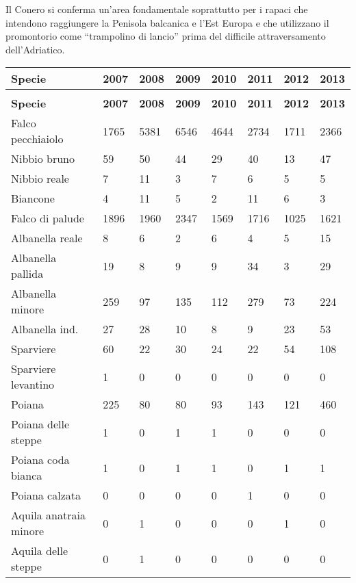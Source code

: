 Il Conero si conferma un{\textquoteright}area fondamentale soprattutto
per i rapaci che intendono raggiungere la Penisola balcanica e
l{\textquoteright}Est Europa e che utilizzano il promontorio come
{\textquotedblleft}trampolino di lancio{\textquotedblright} prima del
difficile attraversamento dell{\textquoteright}Adriatico.
\begin{longtable}{>{\raggedright\arraybackslash}p{}SSSSSSS}
\toprule
\textbf{Specie} & \textbf{2007} & \textbf{2008} & \textbf{2009} & \textbf{2010} & \textbf{2011} & \textbf{2012} & \textbf{2013} \\
\toprule
\endfirsthead
{} \\
\toprule
\textbf{Specie} & \textbf{2007} & \textbf{2008} & \textbf{2009} & \textbf{2010} & \textbf{2011} & \textbf{2012} & \textbf{2013} \\
\toprule
\endhead
 Falco pecchiaiolo & 1765 & 5381 & 6546 & 4644 & 2734 & 1711 & 2366 \\
 Nibbio bruno & 59 & 50 & 44 & 29 & 40 & 13 & 47 \\
 Nibbio reale & 7 & 11 & 3 & 7 & 6 & 5 & 5 \\
 Biancone & 4 & 11 & 5 & 2 & 11 & 6 & 3 \\
 Falco di palude & 1896 & 1960 & 2347 & 1569 & 1716 & 1025 & 1621 \\
 Albanella reale & 8 & 6 & 2 & 6 & 4 & 5 & 15 \\
 Albanella pallida & 19 & 8 & 9 & 9 & 34 & 3 & 29 \\
 Albanella minore & 259 & 97 & 135 & 112 & 279 & 73 & 224 \\
 Albanella ind. & 27 & 28 & 10 & 8 & 9 & 23 & 53 \\
 Sparviere & 60 & 22 & 30 & 24 & 22 & 54 & 108 \\
 Sparviere levantino & 1 & 0 & 0 & 0 & 0 & 0 & 0 \\
 Poiana & 225 & 80 & 80 & 93 & 143 & 121 & 460 \\
 Poiana delle steppe & 1 & 0 & 1 & 1 & 0 & 0 & 0 \\
 Poiana coda bianca & 1 & 0 & 1 & 1 & 0 & 1 & 1 \\
 Poiana calzata & 0 & 0 & 0 & 0 & 1 & 0 & 0 \\
 Aquila anatraia minore & 0 & 1 & 0 & 0 & 0 & 1 & 0 \\
 Aquila delle steppe & 0 & 1 & 0 & 0 & 0 & 0 & 0 \\

\end{longtable}
